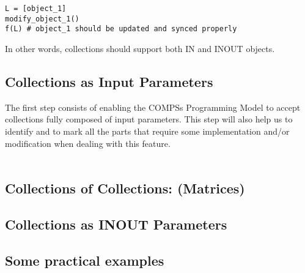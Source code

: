 \begin{verbatim}
L = [object_1]
modify_object_1()
f(L) # object_1 should be updated and synced properly
\end{verbatim}
In other words, collections should support both IN and INOUT objects.

\subsection{Collections as Input Parameters}
\label{subsec:col_in}
The first step consists of enabling the COMPSs Programming Model to accept collections fully composed of input parameters. This step will also help us to identify and to mark all the parts that require some implementation and/or modification when dealing with this feature.\\
\\


\subsection{Collections of Collections: (Matrices)}
\label{subsec:col_depth}

\subsection{Collections as INOUT Parameters}
\label{subsec:col_inout}

\subsection{Some practical examples}
\label{subsec:col_examples}
